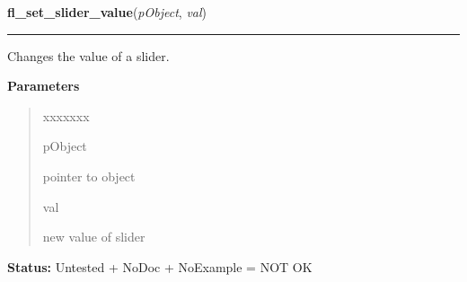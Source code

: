     \label{xformslib:library:fl_set_slider_value}

    \vspace{0.5ex}

\hspace{.8\funcindent}\begin{boxedminipage}{\funcwidth}

    \raggedright \textbf{fl\_set\_slider\_value}(\textit{pObject}, \textit{val})

    \vspace{-1.5ex}

    \rule{\textwidth}{0.5\fboxrule}
\setlength{\parskip}{2ex}
    Changes the value of a slider.

\setlength{\parskip}{1ex}
      \textbf{Parameters}
      \vspace{-1ex}

      \begin{quote}
        \begin{Ventry}{xxxxxxx}

          \item[pObject]

          pointer to object

          \item[val]

          new value of slider

        \end{Ventry}

      \end{quote}

\textbf{Status:} Untested + NoDoc + NoExample = NOT OK



    \end{boxedminipage}

    \label{xformslib:library:fl_get_slider_value}

    \vspace{0.5ex}

